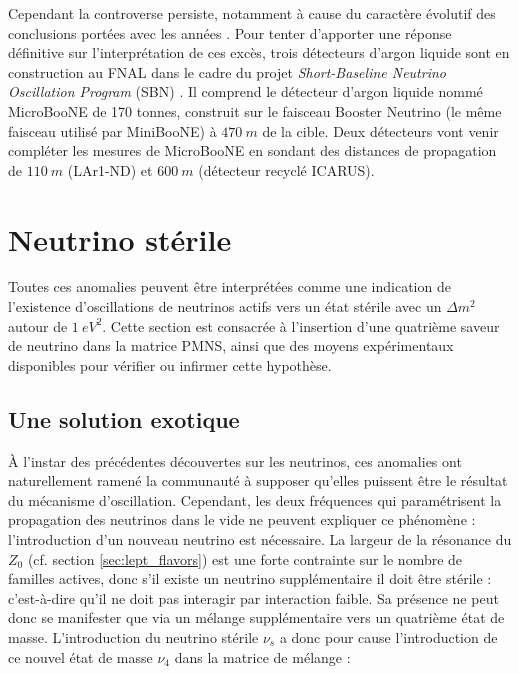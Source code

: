 Cependant la controverse persiste, notamment à cause du caractère évolutif des conclusions portées avec les années \cite{maltoni_michele_2018_1287015}. Pour tenter d'apporter une réponse définitive sur l'interprétation de ces excès, trois détecteurs d'argon liquide sont en construction au FNAL dans le cadre du projet \textit{Short-Baseline Neutrino Oscillation Program} (SBN) \cite{Antonello:2015lea}. Il comprend le détecteur d'argon liquide nommé \og MicroBooNE \fg{} de 170 tonnes, construit sur le faisceau Booster Neutrino (le même faisceau utilisé par MiniBooNE) à $\SI{470}{m}$ de la cible. Deux détecteurs vont venir compléter les mesures de MicroBooNE en sondant des distances de propagation de $\SI{110}{m}$ (LAr1-ND) et $\SI{600}{m}$ (détecteur recyclé ICARUS).\\




\bigbreak

\section{Neutrino stérile}

Toutes ces anomalies peuvent être interprétées comme une indication de l'existence d'oscillations de neutrinos actifs vers un état stérile avec un $\Delta m^2$ autour de $\SI{1}{eV^2}$. Cette section est consacrée à l'insertion d'une quatrième saveur de neutrino dans la matrice PMNS, ainsi que des moyens expérimentaux disponibles pour vérifier ou infirmer cette hypothèse.

\bigbreak

\subsection{Une solution exotique}
\label{sec:sterile_exotic_solution}

À l'instar des précédentes découvertes sur les neutrinos, ces anomalies ont naturellement ramené la communauté à supposer qu'elles puissent être le résultat du mécanisme d'oscillation. Cependant, les deux fréquences qui paramétrisent la propagation des neutrinos dans le vide ne peuvent expliquer ce phénomène : l'introduction d'un nouveau neutrino est nécessaire. La largeur de la résonance du $Z_0$ (cf. section \ref{sec:lept_flavors}) est une forte contrainte sur le nombre de familles actives, donc s'il existe un neutrino supplémentaire il doit être stérile : c'est-à-dire qu'il ne doit pas interagir par interaction faible. Sa présence ne peut donc se manifester que via un mélange supplémentaire vers un quatrième état de masse. L'introduction du neutrino stérile $\nu_s$ a donc pour cause l'introduction de ce nouvel état de masse $\nu_4$ dans la matrice de mélange :

